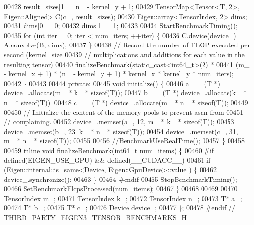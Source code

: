 \begin{DoxyCode}
00428     result\_sizes[1] = n\_ - kernel\_y + 1;
00429     \hyperlink{class_eigen_1_1_tensor_map}{TensorMap<Tensor<T, 2>}, \hyperlink{group__enums_gga45fe06e29902b7a2773de05ba27b47a1ad37d4c71425bb286e9b4103830538fbf}{Eigen::Aligned}> 
      \hyperlink{group___core___module}{C}(c\_, result\_sizes);
00430     \hyperlink{class_eigen_1_1array}{Eigen::array<TensorIndex, 2>} dims;
00431     dims[0] = 0;
00432     dims[1] = 1;
00433 
00434     StartBenchmarkTiming();
00435     \textcolor{keywordflow}{for} (\textcolor{keywordtype}{int} iter = 0; iter < num\_iters; ++iter) \{
00436       \hyperlink{group___core___module}{C}.device(device\_) = \hyperlink{group___core___module_class_eigen_1_1_matrix}{A}.convolve(\hyperlink{group___core___module_class_eigen_1_1_matrix}{B}, dims);
00437     \}
00438     \textcolor{comment}{// Record the number of FLOP executed per second (kernel\_size}
00439     \textcolor{comment}{// multiplications and additions for each value in the resulting tensor)}
00440     finalizeBenchmark(static\_cast<int64\_t>(2) *
00441         (m\_ - kernel\_x + 1) * (n\_ - kernel\_y + 1) * kernel\_x * kernel\_y * num\_iters);
00442   \}
00443 
00444  \textcolor{keyword}{private}:
00445   \textcolor{keywordtype}{void} initialize() \{
00446     a\_ = (\hyperlink{group___sparse_core___module}{T} *) device\_.allocate(m\_ * k\_ * \textcolor{keyword}{sizeof}(\hyperlink{group___sparse_core___module}{T}));
00447     b\_ = (\hyperlink{group___sparse_core___module}{T} *) device\_.allocate(k\_ * n\_ * \textcolor{keyword}{sizeof}(\hyperlink{group___sparse_core___module}{T}));
00448     c\_ = (\hyperlink{group___sparse_core___module}{T} *) device\_.allocate(m\_ * n\_ * \textcolor{keyword}{sizeof}(\hyperlink{group___sparse_core___module}{T}));
00449 
00450     \textcolor{comment}{// Initialize the content of the memory pools to prevent asan from}
00451     \textcolor{comment}{// complaining.}
00452     device\_.memset(a\_, 12, m\_ * k\_ * \textcolor{keyword}{sizeof}(\hyperlink{group___sparse_core___module}{T}));
00453     device\_.memset(b\_, 23, k\_ * n\_ * \textcolor{keyword}{sizeof}(\hyperlink{group___sparse_core___module}{T}));
00454     device\_.memset(c\_, 31, m\_ * n\_ * \textcolor{keyword}{sizeof}(\hyperlink{group___sparse_core___module}{T}));
00455 
00456     \textcolor{comment}{//BenchmarkUseRealTime();}
00457   \}
00458 
00459   \textcolor{keyword}{inline} \textcolor{keywordtype}{void} finalizeBenchmark(int64\_t num\_items) \{
00460 \textcolor{preprocessor}{#if defined(EIGEN\_USE\_GPU) && defined(\_\_CUDACC\_\_)}
00461     \textcolor{keywordflow}{if} (\hyperlink{struct_eigen_1_1internal_1_1is__same}{Eigen::internal::is\_same<Device, Eigen::GpuDevice>::value}
      ) \{
00462       device\_.synchronize();
00463     \}
00464 \textcolor{preprocessor}{#endif}
00465     StopBenchmarkTiming();
00466     SetBenchmarkFlopsProcessed(num\_items);
00467   \}
00468 
00469 
00470   TensorIndex m\_;
00471   TensorIndex k\_;
00472   TensorIndex n\_;
00473   \hyperlink{group___sparse_core___module}{T}* a\_;
00474   \hyperlink{group___sparse_core___module}{T}* b\_;
00475   \hyperlink{group___sparse_core___module}{T}* c\_;
00476   Device device\_;
00477 \};
00478 \textcolor{preprocessor}{#endif  // THIRD\_PARTY\_EIGEN3\_TENSOR\_BENCHMARKS\_H\_}
\end{DoxyCode}
